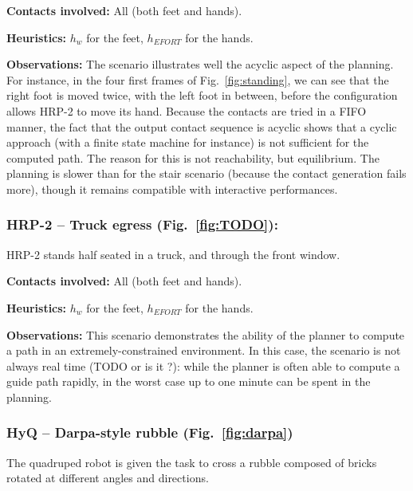 \noindent\textbf{Contacts involved:} All (both feet and hands).

\noindent\textbf{Heuristics:} $h_w$  for the feet, $h_{EFORT}$  for the hands.

\noindent\textbf{Observations:} The scenario illustrates well the acyclic aspect of the planning. For instance, in the four first frames of Fig.~\ref{fig:standing}, we can see that the right foot
is moved twice, with the left foot in between, before the configuration allows HRP-2 to move its hand.
Because the contacts are tried in a FIFO manner, the fact that the output contact sequence is acyclic shows that a cyclic approach (with a finite state machine for instance) is not sufficient
for the computed path. The reason for this is not reachability, but equilibrium. The planning is slower than for the stair scenario (because the contact generation fails more),
though it remains compatible with interactive performances. 

\subsubsection{HRP-2 -- Truck egress (Fig.~\ref{fig:TODO}):}
HRP-2 stands half seated in a truck, and   through the front window.



\noindent\textbf{Contacts involved:} All (both feet and hands).

\noindent\textbf{Heuristics:} $h_w$  for the feet, $h_{EFORT}$  for the hands.

\noindent\textbf{Observations:} This scenario demonstrates the ability of the planner to compute a path in an extremely-constrained environment. In this case,
the scenario is not always real time (TODO or is it ?): while the planner is often able to compute a guide path rapidly, in the worst case up to one minute can be spent
in the planning.


\subsubsection{HyQ -- Darpa-style rubble (Fig.~\ref{fig:darpa})}
The quadruped robot is given the task to cross a rubble composed of bricks rotated at different angles and directions.

